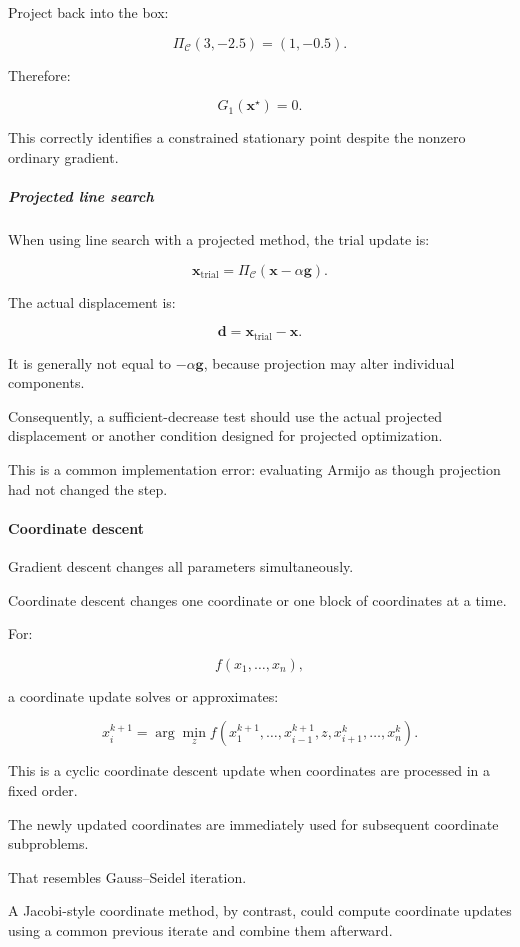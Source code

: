 Project back into the box:

\[
\Pi_{\mathcal C}(3,-2.5)=(1,-0.5).
\]

Therefore:

\[
G_1(\mathbf x^\star)=0.
\]

This correctly identifies a constrained stationary point despite the nonzero ordinary gradient.

\subparagraph{Projected line search}\label{projected-line-search}

When using line search with a projected method, the trial update is:

\[
\mathbf x_{\mathrm{trial}} = \Pi_{\mathcal C} (\mathbf x-\alpha\mathbf g).
\]

The actual displacement is:

\[
\mathbf d= \mathbf x_{\mathrm{trial}}-\mathbf x.
\]

It is generally not equal to \(-\alpha\mathbf g\), because projection may alter individual components.

Consequently, a sufficient-decrease test should use the actual projected displacement or another condition designed for projected optimization.

This is a common implementation error: evaluating Armijo as though projection had not changed the step.

\paragraph{Coordinate descent}\label{coordinate-descent}

Gradient descent changes all parameters simultaneously.

Coordinate descent changes one coordinate or one block of coordinates at a time.

For:

\[
f(x_1,\ldots,x_n),
\]

a coordinate update solves or approximates:

\[
\boxed{ x_i^{k+1} = \arg\min_z f(x_1^{k+1},\ldots,x_{i-1}^{k+1}, z,x_{i+1}^{k},\ldots,x_n^k) }.
\]

This is a cyclic coordinate descent update when coordinates are processed in a fixed order.

The newly updated coordinates are immediately used for subsequent coordinate subproblems.

That resembles Gauss--Seidel iteration.

A Jacobi-style coordinate method, by contrast, could compute coordinate updates using a common previous iterate and combine them afterward.

